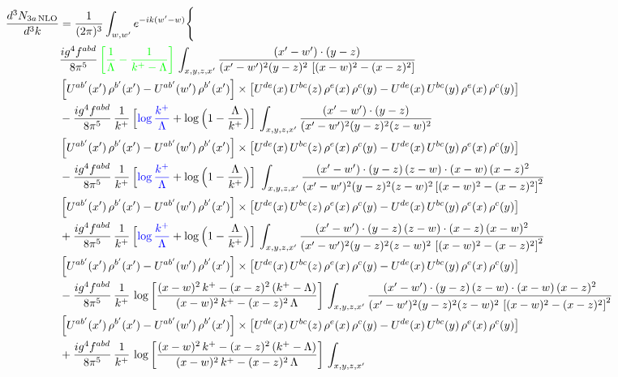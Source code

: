 \documentclass[9pt]{article}
\numberwithin{equation}{section}
\begin{document}
\begin{align}
\frac{d^{3}N_{3a\,\rm NLO}}{d^{3}k} & =\frac{1}{(2\pi)^{3}}\int_{w,w'}e^{-ik(w'-w)}\Bigg\{\notag \\ & \frac{ig^{4}f^{abd}}{8\pi^{5}}\,{\color{green}\left[\frac{1}{\Lambda}-\frac{1}{k^{+}-\Lambda}\right]}\,\int_{x,y,z,x'}
\frac{(x'-w')\cdot(y-z)}{(x'-w')^{2}(y-z)^{2}\,\left[(x-w)^{2}-(x-z)^{2}\right]}\notag \\ & \left[U^{ab'}(x')\,\rho^{b'}(x')-U^{ab'}(w')\, \rho^{b'}(x')\right]\times \left[U^{de}(x)\,U^{bc}(z)\, \rho^{e}(x)\,\rho^{c}(y)-U^{de}(x)\,U^{bc}(y)\,\rho^{e}(x)\,\rho^{c}(y)\right]\notag \\ & -\frac{ig^{4}f^{abd}}{8\pi^{5}}\,\frac{1}{k^{+}}\,\Big[{\color{blue}\log\frac{k^{+}}{\Lambda}}+\log\Big(1-\frac{\Lambda}{k^{+}}\Big)\Big]\,\int_{x,y,z,x'}
\frac{(x'-w')\cdot(y-z)}{(x'-w')^{2}(y-z)^{2}(z-w)^{2}}\notag \\ & \left[U^{ab'}(x')\,\rho^{b'}(x')-U^{ab'}(w')\, \rho^{b'}(x')\right]\times \left[U^{de}(x)\,U^{bc}(z)\, \rho^{e}(x)\,\rho^{c}(y)-U^{de}(x)\,U^{bc}(y)\,\rho^{e}(x)\,\rho^{c}(y)\right]\notag \\ & -\frac{ig^{4}f^{abd}}{8\pi^{5}}\,\frac{1}{k^{+}}\,\Big[{\color{blue}\log\frac{k^{+}}{\Lambda}}+\log\Big(1-\frac{\Lambda}{k^{+}}\Big)\Big]\,\,\int_{x,y,z,x'}
\frac{(x'-w')\cdot(y-z)\,(z-w)\cdot(x-w)\,(x-z)^{2}}{(x'-w')^{2}(y-z)^{2}(z-w)^{2}\left[(x-w)^{2}-(x-z)^{2}\right]^{2}}\notag \\ & \left[U^{ab'}(x')\,\rho^{b'}(x')-U^{ab'}(w')\, \rho^{b'}(x')\right]\times \left[U^{de}(x)\,U^{bc}(z)\, \rho^{e}(x)\,\rho^{c}(y)-U^{de}(x)\,U^{bc}(y)\,\rho^{e}(x)\,\rho^{c}(y)\right]\notag \\ & +\frac{ig^{4}f^{abd}}{8\pi^{5}}\,\frac{1}{k^{+}}\,\Big[{\color{blue}\log\frac{k^{+}}{\Lambda}}+\log\Big(1-\frac{\Lambda}{k^{+}}\Big)\Big]\,\int_{x,y,z,x'}
\frac{(x'-w')\cdot(y-z)\,(z-w)\cdot(x-z)\,(x-w)^{2}}{(x'-w')^{2}(y-z)^{2}(z-w)^{2}\,\left[(x-w)^{2}-(x-z)^{2}\right]^{2}}\notag \\ & \left[U^{ab'}(x')\,\rho^{b'}(x')-U^{ab'}(w')\, \rho^{b'}(x')\right]\times \left[U^{de}(x)\,U^{bc}(z)\, \rho^{e}(x)\,\rho^{c}(y)-U^{de}(x)\,U^{bc}(y)\,\rho^{e}(x)\,\rho^{c}(y)\right]\notag \\ & 
-\frac{ig^{4}f^{abd}}{8\pi^{5}}\,\frac{1}{k^{+}}\,\log{\left[\frac{(x-w)^{2}\,k^{+}-(x-z)^{2}\,(k^{+}-\Lambda)}{(x-w)^{2}\,k^{+}-(x-z)^{2}\,\Lambda}\right]}\,\int_{x,y,z,x'}
\frac{(x'-w')\cdot(y-z)\,(z-w)\cdot(x-w)\,(x-z)^{2}}{(x'-w')^{2}(y-z)^{2}(z-w)^{2}\,\left[(x-w)^{2}-(x-z)^{2}\right]^{2}}\notag \\ & \left[U^{ab'}(x')\,\rho^{b'}(x')-U^{ab'}(w')\, \rho^{b'}(x')\right]\times \left[U^{de}(x)\,U^{bc}(z)\, \rho^{e}(x)\,\rho^{c}(y)-U^{de}(x)\,U^{bc}(y)\,\rho^{e}(x)\,\rho^{c}(y)\right]\notag \\ & +\frac{ig^{4}f^{abd}}{8\pi^{5}}\,\frac{1}{k^{+}}\,\log{\left[\frac{(x-w)^{2}\,k^{+}-(x-z)^{2}\,(k^{+}-\Lambda)}{(x-w)^{2}\,k^{+}-(x-z)^{2}\,\Lambda}\right]}\,\int_{x,y,z,x'}

\end{align}
\end{document}
